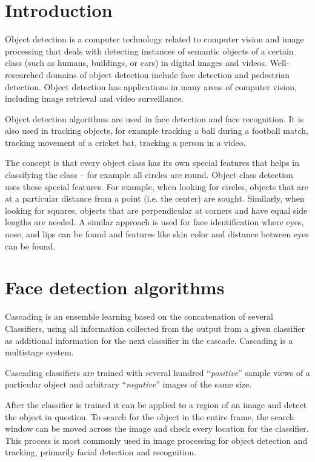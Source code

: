 \documentclass[a4paper,12pt]{report}
\begin{document}
  \section{Introduction}
    Object detection is a computer technology related to computer vision and image processing that deals with detecting instances of semantic objects of a certain class (such as humans, buildings, or cars) in digital images and videos. Well-researched domains of object detection include face detection and pedestrian detection. Object detection has applications in many areas of computer vision, including image retrieval and video surveillance. \par
    Object detection algorithms are used in face detection and face recognition. It is also used in tracking objects, for example tracking a ball during a football match, tracking movement of a cricket bat, tracking a person in a video.\par
    The concept is that every object class has its own special features that helps in classifying the class – for example all circles are round. Object class detection uses these special features. For example, when looking for circles, objects that are at a particular distance from a point (i.e. the center) are sought. Similarly, when looking for squares, objects that are perpendicular at corners and have equal side lengths are needed. A similar approach is used for face identification where eyes, nose, and lips can be found and features like skin color and distance between eyes can be found\cite{wiki_link}.\par

\section{Face detection algorithms}
    Cascading is an ensemble learning based on the concatenation of several Classifiers, using all information collected from the output from a given classifier as additional information for the next classifier in the cascade. Cascading is a multistage system.\par
    Cascading classifiers are trained with several hundred ``\emph{positive}'' sample views of a particular object and arbitrary ``\emph{negative}'' images of the same size. \par
    After the classifier is trained it can be applied to a region of an image and detect the object in question. To search for the object in the entire frame, the search window can be moved across the image and check every location for the classifier. This process is most commonly used in image processing for object detection and tracking, primarily facial detection and recognition.\par
\end{document}
